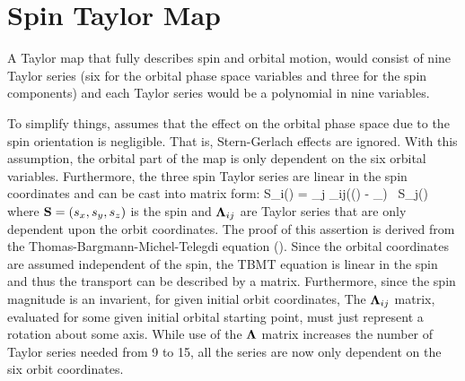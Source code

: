 \section{Spin Taylor Map}
\label{s:spin.map}

A Taylor map that fully describes spin and orbital motion, would
consist of nine Taylor series (six for the orbital phase space
variables and three for the spin components) and each Taylor series
would be a polynomial in nine variables.

To simplify things, \bmad assumes that the effect on the orbital phase
space due to the spin orientation is negligible. That is, Stern-Gerlach
effects are ignored. With this assumption, the orbital part of the map
is only dependent on the six orbital variables. Furthermore, 
the three spin Taylor series are linear in the spin coordinates
and can be cast into matrix form:
\Begineq
  S_i(\Out) = \sum_{j} \Bf\Lambda_{ij}(\bfr(\In) - \bfr_\Ref) \, S_j(\In)
\Endeq
where ${\bf S} = (s_x, s_y, s_z)$ is the spin and ${\bf \Lambda}_{ij}$ are
Taylor series that are only dependent upon the orbit coordinates. The
proof of this assertion is derived from the
Thomas-Bargmann-Michel-Telegdi equation (). Since the
orbital coordinates are assumed independent of the spin, the TBMT
equation is linear in the spin and thus the transport can be described
by a matrix. Furthermore, since the spin magnitude is an invarient,
for given initial orbit coordinates, The ${\bf \Lambda}_{ij}$ matrix,
evaluated for some given initial orbital starting point, must just
represent a rotation about some axis. While use of the ${\bf \Lambda}$
matrix increases the number of Taylor series needed from 9 to 15, all
the series are now only dependent on the six orbit coordinates.

